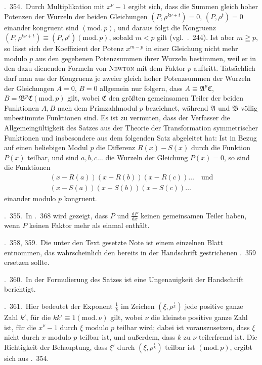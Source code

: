 \textsection.\ 354.\ Durch Multiplikation mit $x^\nu-1$ ergibt sich, dass die Summen gleich hoher Potenzen der Wurzeln der beiden Gleichungen $(P,\rho^{k\nu+t})=0$, $(P,\rho^t)=0$ einander kongruent sind $(\mathrm{mod.}\,p)$, und daraus folgt die Kongruenz $(P,\rho^{k\nu+t})\equiv(P,\rho^t)(\mathrm{mod.}\,p)$, sobald $m<p$ gilt (vgl.\ \textsection.\ 244). Ist aber $m\geqq p$, so lässt sich der Koeffizient der Potenz $x^{m-p}$ in einer Gleichung nicht mehr modulo $p$ aus den gegebenen Potenzsummen ihrer Wurzeln bestimmen, weil er in den dazu dienenden Formeln von \textsc{Newton} mit dem Faktor $p$ auftritt. Tatsächlich darf man aus der Kongruenz je zweier gleich hoher Potenzsummen der Wurzeln der Gleichungen $A=0$, $B=0$ allgemein nur folgern, dass $A\equiv\mathfrak A^p\mathfrak C$, $B=\mathfrak B^p\mathfrak C(\mathrm{mod.}\,p)$ gilt, wobei $\mathfrak C$ den größten gemeinsamen Teiler der beiden Funktionen $A,B$ nach dem Primzahlmodul $p$ bezeichnet, während $\mathfrak A$ und $\mathfrak B$ völlig unbestimmte Funktionen sind. Es ist zu vermuten, dass der Verfasser die Allgemeingültigkeit des Satzes aus der Theorie der Transformation symmetrischer Funktionen und insbesondere aus dem folgenden Satz abgeleitet hat: Ist in Bezug auf einen beliebigen Modul $p$ die Differenz $R(x)-S(x)$ durch die Funktion $P(x)$ teilbar, und sind $a,b,c\ldots$ die Wurzeln der Gleichung $P(x)=0$, so sind die Funktionen
\[
\begin{gathered}
(x-R(a))(x-R(b))(x-R(c))\ldots\quad\text{und}\\
(x-S(a))(x-S(b))(x-S(c))\ldots
\end{gathered}
\]
einander modulo $p$ kongruent.

\textsection.\ 355.\ In \textsection.\ 368 wird gezeigt, dass $P$ und $\frac{\mathrm{d}P}{\mathrm{d}x}$ keinen gemeinsamen Teiler haben, wenn $P$ keinen Faktor mehr als einmal enthält.

\textsection\textsection.\ 358, 359.\ Die unter den Text gesetzte Note ist einem einzelnen Blatt entnommen, das wahrscheinlich den bereits in der Handschrift gestrichenen \textsection.\ 359 ersetzen sollte.

\textsection.\ 360.\ In der Formulierung des Satzes ist eine Ungenauigkeit der Handschrift berichtigt.

\textsection.\ 361.\ Hier bedeutet der Exponent $\frac1k$ im Zeichen $(\xi,\rho^{\frac1k})$ jede positive ganze Zahl $k'$, für die $kk'\equiv1(\mathrm{mod.}\,\nu)$ gilt, wobei $\nu$ die kleinste positive ganze Zahl ist, für die $x^\nu-1$ durch $\xi$ modulo $p$ teilbar wird; dabei ist vorauszusetzen, dass $\xi$ nicht durch $x$ modulo $p$ teilbar ist, und außerdem, dass $k$ zu $\nu$ teilerfremd ist. Die Richtigkeit der Behauptung, dass $\xi'$ durch $(\xi,\rho^{\frac1k})$ teilbar ist $(\mathrm{mod.}\,p)$, ergibt sich aus \textsection.\ 354.

